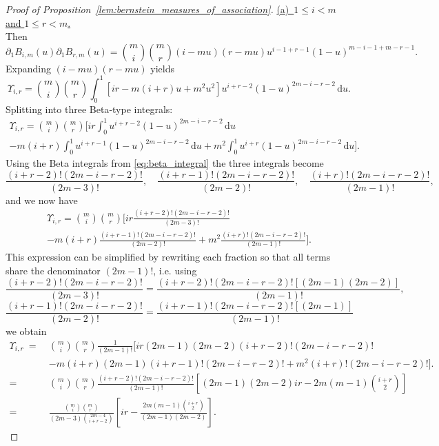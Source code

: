 \documentclass{article}
\theoremstyle{definition}
\newcommand{\de}{\mathrm{\,d}}
\begin{document}
\begin{proof}[Proof of Proposition~\ref{lem:bernstein_measures_of_association}]
\smallskip
\noindent
\underline{(a)~$1 \le i < m$ and $1 \le r < m$.}\\
Then
\[
\partial_1 B_{i,m}(u)\partial_1 B_{r,m}(u)
= \binom{m}{i}\binom{m}{r}(i - mu)(r - mu)u^{i-1 + r-1}(1-u)^{m-i-1 + m-r-1}.
\]
Expanding $(i - mu)(r - mu)$ yields
\[
\Upsilon_{i,r}
= \binom{m}{i}\binom{m}{r}\int_0^1  \left[ ir - m(i+r)u + m^2u^2  \right]  u^{i+r-2}  (1-u)^{2m- i - r -2}\de u.
\]
Splitting into three Beta‐type integrals:
\begin{multline*}
\Upsilon_{i,r}
= \binom{m}{i}\binom{m}{r} \biggl[
  ir \int_0^1 u^{i+r-2}(1-u)^{2m- i - r -2}\de u \\
  - m(i+r) \int_0^1 u^{i+r-1}(1-u)^{2m- i - r -2}\de u
  + m^2 \int_0^1 u^{i+r}(1-u)^{2m- i - r -2}\de u
\biggr].
\end{multline*}
Using the Beta integrals from \eqref{eq:beta_integral} the three integrals become
\[
\frac{(i+r-2)!\left(2m- i - r -2\right)!}{(2m-3)!},
\quad \frac{(i+r-1)!\left(2m- i - r -2\right)!}{(2m-2)!},
\quad\frac{(i+r)!\left(2m- i - r -2\right)!}{(2m-1)!},
\]
and we now have
\begin{multline*}
\Upsilon_{i,r}
=\binom{m}{i}\binom{m}{r}
\biggl[
ir \frac{(i+r-2)!\left(2m- i - r -2\right)!}{(2m-3)!} \\
- m(i+r)\frac{(i+r-1)!\left(2m- i - r -2\right)!}{(2m-2)!} + m^2\frac{(i+r)!\left(2m- i - r -2\right)!}{(2m-1)!}
\biggr].
\end{multline*}
This expression can be simplified by rewriting each fraction so that all terms share the denominator \((2m-1)!\), i.e. using
\[
    \frac{(i+r-2)!(2m- i - r -2)!}{(2m-3)!}
    =\frac{(i+r-2)!(2m- i - r -2)!\left[(2m-1)(2m-2)\right]}{(2m-1)!},
\]
\[
    \frac{(i+r-1)!(2m- i - r -2)!}{(2m-2)!}
    =\frac{(i+r-1)!(2m- i - r -2)!\left[(2m-1)\right]}{(2m-1)!}
\]
we obtain
\begin{align*}
    \Upsilon_{i,r}
    ~ =~ & \binom{m}{i}\binom{m}{r} \frac{1}{(2m-1)!}    \biggl[ ir(2m-1)(2m-2)(i+r-2)!\left(2m- i - r -2\right)! \\
    & - m(i+r)(2m-1)(i+r-1)!\left(2m- i - r -2\right)! + m^2(i+r)!\left(2m- i - r -2\right)! \biggr]. \\
    =~ &\binom{m}{i}\binom{m}{r}\frac{(i+r-2)!\left(2m- i - r -2\right)!}{(2m-1)! } \left[ (2m-1)(2m-2)ir  -  2m(m-1)\binom{i+r}{2}\right] \\
    =~ & \frac{\binom{m}{i}\binom{m}{r}}{(2m-3)\binom{2m-4}{i+r-2}}
    \left[ ir   -   \frac{2m(m-1)\binom{i+r}{2}}{(2m-1)(2m-2)}\right]
.\end{align*}
\smallskip

\end{proof}
\end{document}
